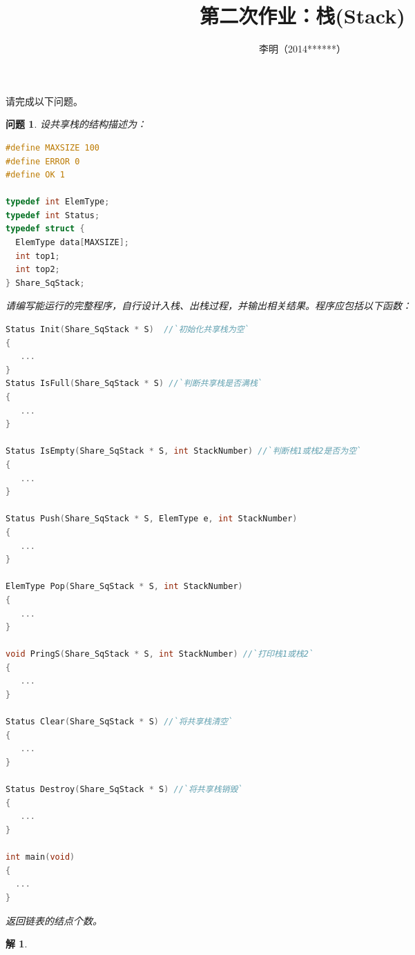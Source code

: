 \documentclass[10pt,a4paper,twoside,openright,titlepage,fleqn,
tablecaptionabove]{article}
\begin{document}
\begin{CJK}{UTF8}{gkai}

\title{第二次作业：栈(Stack)}
\author{李明（2014******）} %
\maketitle

\newtheorem*{jie}{{解}}
\newtheorem{wenti}{{问题}}



请完成以下问题。

\begin{wenti}
设共享栈的结构描述为：
\begin{lstlisting}[language=C]
#define MAXSIZE 100
#define ERROR 0
#define OK 1

typedef int ElemType;
typedef int Status;
typedef struct {
  ElemType data[MAXSIZE];
  int top1;
  int top2;
} Share_SqStack;
\end{lstlisting}
请编写能运行的完整程序，自行设计入栈、出栈过程，并输出相关结果。程序应包括以下函数：
\begin{lstlisting}[language=C]
Status Init(Share_SqStack * S)  //`初始化共享栈为空`
{
   ...
}
Status IsFull(Share_SqStack * S) //`判断共享栈是否满栈`
{
   ...
}

Status IsEmpty(Share_SqStack * S, int StackNumber) //`判断栈1或栈2是否为空`
{
   ...
}

Status Push(Share_SqStack * S, ElemType e, int StackNumber)
{
   ...
}

ElemType Pop(Share_SqStack * S, int StackNumber)
{
   ...
}

void PringS(Share_SqStack * S, int StackNumber) //`打印栈1或栈2`
{
   ...
}

Status Clear(Share_SqStack * S) //`将共享栈清空`
{
   ...
}

Status Destroy(Share_SqStack * S) //`将共享栈销毁`
{
   ...
}

int main(void)
{
  ...
}
\end{lstlisting}
返回链表的结点个数。
\end{wenti}


\begin{jie}



\end{jie}
\end{CJK}
\end{document}
